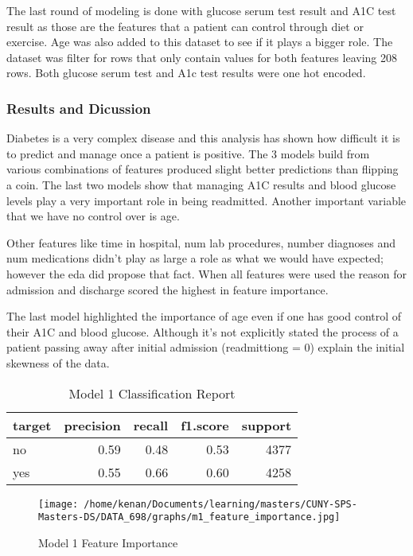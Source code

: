 \documentclass[5p]{elsarticle} %
\begin{document}
The last round of modeling is done with glucose serum test result and
A1C test result as those are the features that a patient can control
through diet or exercise. Age was also added to this dataset to see if
it plays a bigger role. The dataset was filter for rows that only
contain values for both features leaving 208 rows. Both glucose serum
test and A1c test results were one hot encoded.

\hypertarget{results-and-dicussion}{%
\subsubsection{Results and Dicussion}\label{results-and-dicussion}}

Diabetes is a very complex disease and this analysis has shown how
difficult it is to predict and manage once a patient is positive. The 3
models build from various combinations of features produced slight
better predictions than flipping a coin. The last two models show that
managing A1C results and blood glucose levels play a very important role
in being readmitted. Another important variable that we have no control
over is age.

Other features like time in hospital, num lab procedures, number
diagnoses and num medications didn't play as large a role as what we
would have expected; however the eda did propose that fact. When all
features were used the reason for admission and discharge scored the
highest in feature importance.

The last model highlighted the importance of age even if one has good
control of their A1C and blood glucose. Although it's not explicitly
stated the process of a patient passing away after initial admission
(readmittiong = 0) explain the initial skewness of the data.

\clearpage
\onecolumn

\begin{table}

\caption{\label{tab:unnamed-chunk-3}Model 1 Classification Report}
\centering
\begin{tabular}[t]{l|r|r|r|r}
\hline
target & precision & recall & f1.score & support\\
\hline
no & 0.59 & 0.48 & 0.53 & 4377\\
\hline
yes & 0.55 & 0.66 & 0.60 & 4258\\
\hline
\end{tabular}
\end{table}

\begin{figure}
\hypertarget{id}{%
\centering
\texttt{[image: /home/kenan/Documents/learning/masters/CUNY-SPS-Masters-DS/DATA\_698/graphs/m1\_feature\_importance.jpg]}
\caption{Model 1 Feature Importance}\label{id}
}
\end{figure}
\end{document}
